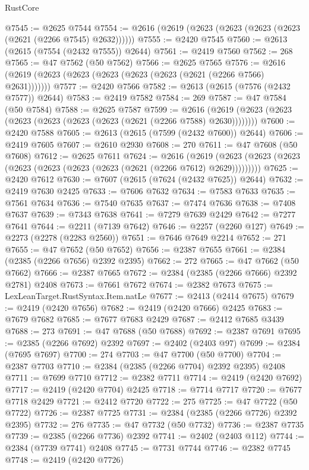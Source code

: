 \begin{lexlean}{RustCore}
\begin{coremodule}
@7545 := @2625 @7544
@7554 := @2616 (@2619 (@2623 (@2623 (@2623 (@2623 (@2621 (@2266 @7545) @2632))))))
@7555 := @2420 @7545
@7560 := @2613 (@2615 (@7554 (@2432 @7555)) @2644)
@7561 := @2419 @7560
@7562 := 268
@7565 := @47 @7562 (@50 @7562)
@7566 := @2625 @7565
@7576 := @2616 (@2619 (@2623 (@2623 (@2623 (@2623 (@2623 (@2621 (@2266 @7566) @2631)))))))
@7577 := @2420 @7566
@7582 := @2613 (@2615 (@7576 (@2432 @7577)) @2644)
@7583 := @2419 @7582
@7584 := 269
@7587 := @47 @7584 (@50 @7584)
@7588 := @2625 @7587
@7599 := @2616 (@2619 (@2623 (@2623 (@2623 (@2623 (@2623 (@2623 (@2621 (@2266 @7588) @2630))))))))
@7600 := @2420 @7588
@7605 := @2613 (@2615 (@7599 (@2432 @7600)) @2644)
@7606 := @2419 @7605
@7607 := @2610 @2930
@7608 := 270
@7611 := @47 @7608 (@50 @7608)
@7612 := @2625 @7611
@7624 := @2616
    (@2619 (@2623 (@2623 (@2623 (@2623 (@2623 (@2623 (@2623 (@2621 (@2266 @7612) @2629)))))))))
@7625 := @2420 @7612
@7630 := @7607 (@2615 (@7624 (@2432 @7625)) @2644)
@7632 := @2419 @7630 @2425
@7633 := @7606 @7632
@7634 := @7583 @7633
@7635 := @7561 @7634
@7636 := @7540 @7635
@7637 := @7474 @7636
@7638 := @7408 @7637
@7639 := @7343 @7638
@7641 := @7279 @7639 @2429
@7642 := @7277 @7641
@7644 := @2211 (@7139 @7642)
@7646 := @2257 (@2260 @127)
@7649 := @2273 (@2278 (@2283 @2560))
@7651 := @7646 @7649 @2214
@7652 := 271
@7655 := @47 @7652 (@50 @7652)
@7656 := @2387 @7655
@7661 := @2384 (@2385 (@2266 @7656) @2392 @2395)
@7662 := 272
@7665 := @47 @7662 (@50 @7662)
@7666 := @2387 @7665
@7672 := @2384 (@2385 (@2266 @7666) @2392 @2781) @2408
@7673 := @7661 @7672
@7674 := @2382 @7673
@7675 := LexLeanTarget.RustSyntax.Item.natLe
@7677 := @2413 (@2414 @7675)
@7679 := @2419 (@2420 @7656)
@7682 := @2419 (@2420 @7666) @2425
@7683 := @7679 @7682
@7685 := @7677 @7683 @2429
@7687 := @2412 @7685 @3439
@7688 := 273
@7691 := @47 @7688 (@50 @7688)
@7692 := @2387 @7691
@7695 := @2385 (@2266 @7692) @2392
@7697 := @2402 (@2403 @97)
@7699 := @2384 (@7695 @7697)
@7700 := 274
@7703 := @47 @7700 (@50 @7700)
@7704 := @2387 @7703
@7710 := @2384 (@2385 (@2266 @7704) @2392 @2395) @2408
@7711 := @7699 @7710
@7712 := @2382 @7711
@7714 := @2419 (@2420 @7692)
@7717 := @2419 (@2420 @7704) @2425
@7718 := @7714 @7717
@7720 := @7677 @7718 @2429
@7721 := @2412 @7720
@7722 := 275
@7725 := @47 @7722 (@50 @7722)
@7726 := @2387 @7725
@7731 := @2384 (@2385 (@2266 @7726) @2392 @2395)
@7732 := 276
@7735 := @47 @7732 (@50 @7732)
@7736 := @2387 @7735
@7739 := @2385 (@2266 @7736) @2392
@7741 := @2402 (@2403 @112)
@7744 := @2384 (@7739 @7741) @2408
@7745 := @7731 @7744
@7746 := @2382 @7745
@7748 := @2419 (@2420 @7726)

\end{coremodule}
\end{lexlean}
